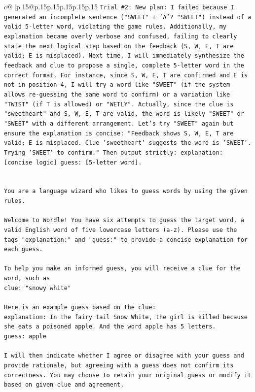 \documentclass{article}
\begin{document}
{\begin{supertabular}{c@{$\;$}|p{.15\linewidth}@{}p{.15\linewidth}p{.15\linewidth}p{.15\linewidth}p{.15\linewidth}p{.15\linewidth}}
{{{\texttt{Trial \#2: New plan: I failed because I generated an incomplete sentence ("SWEET" + 'A'? "SWEET") instead of a valid 5{-}letter word, violating the game rules. Additionally, my explanation became overly verbose and confused, failing to clearly state the next logical step based on the feedback (S, W, E, T are valid; E is misplaced). Next time, I will immediately synthesize the feedback and clue to propose a single, complete 5{-}letter word in the correct format. For instance, since S, W, E, T are confirmed and E is not in position 4, I will try a word like "SWEET" (if the system allows re{-}guessing the same word to confirm) or a variation like "TWIST" (if T is allowed) or "WETLY". Actually, since the clue is "sweetheart" and S, W, E, T are valid, the word is likely "SWEET" or "SWEET" with a different arrangement. Let's try "SWEET" again but ensure the explanation is concise: "Feedback shows S, W, E, T are valid; E is misplaced. Clue 'sweetheart' suggests the word is 'SWEET'. Trying 'SWEET' to confirm." Then output strictly: explanation: {[}concise logic{]} guess: {[}5{-}letter word{]}.} \\
\\ 
\\ 
\texttt{You are a language wizard who likes to guess words by using the given rules.} \\
\\ 
\texttt{Welcome to Wordle! You have six attempts to guess the target word, a valid English word of five lowercase letters (a{-}z). Please use the tags "explanation:" and "guess:" to provide a concise explanation for each guess.} \\
\\ 
\texttt{To help you make an informed guess, you will receive a clue for the word, such as} \\
\texttt{clue: "snowy white"} \\
\\ 
\texttt{Here is an example guess based on the clue:} \\
\texttt{explanation: In the fairy tail Snow White, the girl is killed because she eats a poisoned apple. And the word apple has 5 letters.} \\
\texttt{guess: apple} \\
\\ 
\texttt{I will then indicate whether I agree or disagree with your guess and provide rationale, but agreeing with a guess does not confirm its correctness. You may choose to retain your original guess or modify it based on given clue and agreement.} \\
}}}
\end{supertabular}}
\end{document}
